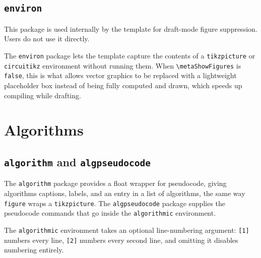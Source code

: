 	\subsection{\texttt{environ}}
	\noindent\colorbox{themecolour!15}{\parbox{\linewidth}{\small This package is used internally by the template for draft-mode figure suppression. Users do not use it directly.}}\vspace{0.5\baselineskip}
	
	The \texttt{environ} package lets the template capture the contents of a \texttt{tikzpicture} or \texttt{circuitikz} environment without running them. When \texttt{\textbackslash metaShowFigures} is \texttt{false}, this is what allows vector graphics to be replaced with a lightweight placeholder box instead of being fully computed and drawn, which speeds up compiling while drafting.

\section{Algorithms}

	\subsection{\texttt{algorithm} and \texttt{algpseudocode}}
	The \texttt{algorithm} package provides a float wrapper for pseudocode, giving algorithms captions, labels, and an entry in a list of algorithms, the same way \texttt{figure} wraps a \texttt{tikzpicture}. The \texttt{algpseudocode} package supplies the pseudocode commands that go inside the \texttt{algorithmic} environment.
	
	The \texttt{algorithmic} environment takes an optional line-numbering argument: \texttt{[1]} numbers every line, \texttt{[2]} numbers every second line, and omitting it disables numbering entirely.
	
